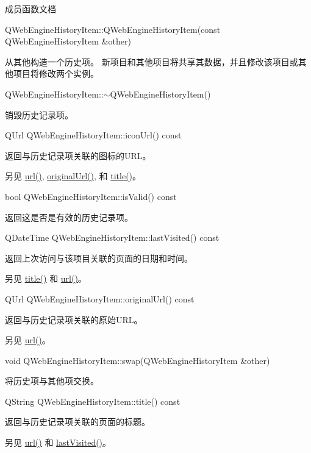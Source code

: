 成员函数文档

QWebEngineHistoryItem::QWebEngineHistoryItem(const QWebEngineHistoryItem \&other)

从其他构造一个历史项。 新项目和其他项目将共享其数据，并且修改该项目或其他项目将修改两个实例。

QWebEngineHistoryItem::$\sim$QWebEngineHistoryItem()

销毁历史记录项。

QUrl QWebEngineHistoryItem::iconUrl() const

返回与历史记录项关联的图标的URL。

另见 \href{https://github.com/QtDocumentCN/QtDocumentCN/blob/master/Src/W/QWebEngineHistoryItem/qwebenginehistoryitem.html#url}{url()}, \href{https://github.com/QtDocumentCN/QtDocumentCN/blob/master/Src/W/QWebEngineHistoryItem/qwebenginehistoryitem.html#originalUrl}{originalUrl()}, 和 \href{https://github.com/QtDocumentCN/QtDocumentCN/blob/master/Src/W/QWebEngineHistoryItem/qwebenginehistoryitem.html#title}{title()}。

bool QWebEngineHistoryItem::isValid() const

返回这是否是有效的历史记录项。

QDateTime QWebEngineHistoryItem::lastVisited() const

返回上次访问与该项目关联的页面的日期和时间。

另见 \href{https://github.com/QtDocumentCN/QtDocumentCN/blob/master/Src/W/QWebEngineHistoryItem/qwebenginehistoryitem.html#title}{title()} 和 \href{https://github.com/QtDocumentCN/QtDocumentCN/blob/master/Src/W/QWebEngineHistoryItem/qwebenginehistoryitem.html#url}{url()}。

QUrl QWebEngineHistoryItem::originalUrl() const

返回与历史记录项关联的原始URL。

另见 \href{https://github.com/QtDocumentCN/QtDocumentCN/blob/master/Src/W/QWebEngineHistoryItem/qwebenginehistoryitem.html#url}{url()}。

void QWebEngineHistoryItem::swap(QWebEngineHistoryItem \&other)

将历史项与其他项交换。

QString QWebEngineHistoryItem::title() const

返回与历史记录项关联的页面的标题。

另见 \href{https://github.com/QtDocumentCN/QtDocumentCN/blob/master/Src/W/QWebEngineHistoryItem/qwebenginehistoryitem.html#url}{url()} 和 \href{https://github.com/QtDocumentCN/QtDocumentCN/blob/master/Src/W/QWebEngineHistoryItem/qwebenginehistoryitem.html#lastVisited}{lastVisited()}。


